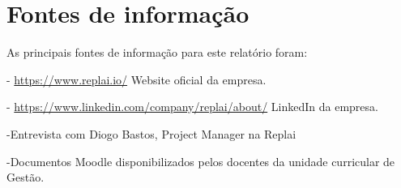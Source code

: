\section{Fontes de informação}
As principais fontes de informação para este relatório foram:

- \href{https://www.replai.io/}{https://www.replai.io/}  Website oficial da empresa. 

- \href{https://www.linkedin.com/company/replai/about/}{https://www.linkedin.com/company/replai/about/}  LinkedIn da empresa. 

-Entrevista com Diogo Bastos, Project Manager na Replai

-Documentos Moodle disponibilizados pelos docentes da unidade curricular de Gestão.